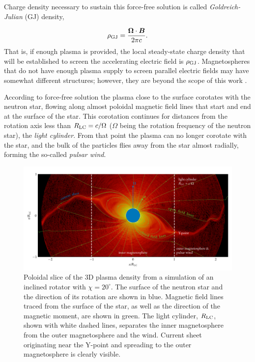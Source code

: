 Charge density necessary to sustain this force-free solution is called \emph{Goldreich-Julian} (GJ) density,

\begin{equation}
    \rho_{\rm GJ} = \frac{\bm{\Omega} \cdot\bm{B}}{2\pi c}.
\end{equation}
\noindent That is, if enough plasma is provided, the local steady-state charge density that will be established to screen the accelerating electric field is $\rho_{\rm GJ}$. Magnetospheres that do not have enough plasma supply to screen parallel electric fields may have somewhat different structures; however, they are beyond the scope of this work \citep[see, e.g.,][]{2020ApJ...889...69C}.

According to force-free solution the plasma close to the surface corotates with the neutron star, flowing along almost poloidal magnetic field lines that start and end at the surface of the star. This corotation continues for distances from the rotation axis less than $R_{\rm LC}=c/\Omega$ ($\Omega$ being the rotation frequency of the neutron star), the \emph{light cylinder}. From that point the plasma can no longer corotate with the star, and the bulk of the particles flies away from the star almost radially, forming the so-called \emph{pulsar wind}.

\begin{figure}[htb]
\centering
\includegraphics[width=\columnwidth]{figures/ch3-pulsar/fig1.pdf}
\caption{Poloidal slice of the 3D plasma density from a simulation of an inclined rotator with $\chi=20^\circ$. The surface of the neutron star and the direction of its rotation are shown in blue. Magnetic field lines traced from the surface of the star, as well as the direction of the magnetic moment, are shown in green. The light cylinder, $R_{\rm LC}$, shown with white dashed lines, separates the inner magnetosphere from the outer magnetosphere and the wind. Current sheet originating near the Y-point and spreading to the outer magnetosphere is clearly visible. }
\label{fig:psr-pulsardraft}
\end{figure}

